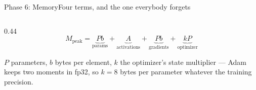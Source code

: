 \documentclass[aspectratio=169,11pt]{beamer}
\newcommand{\subtle}[1]{{\footnotesize\color{nxSlate}#1}}
\begin{document}
\begin{frame}{Phase 6: Memory}{Four terms, and the one everybody forgets}
  \vspace{0.1cm}
  \begin{columns}[T]
    \begin{column}{0.44\textwidth}
      \vspace{0.15cm}
      {\footnotesize
      \[ M_{\text{peak}} = \underbrace{P b}_{\text{params}}
                        + \underbrace{A}_{\text{activations}}
                        + \underbrace{P b}_{\text{gradients}}
                        + \underbrace{k P}_{\text{optimizer}} \]}
      \vspace{0.05cm}

      \subtle{$P$ parameters, $b$ bytes per element, $k$ the optimizer's state
      multiplier --- Adam keeps two moments in fp32, so $k = 8$ bytes per
      parameter whatever the training precision.}


\end{column}
\end{columns}
\end{frame}
\end{document}

